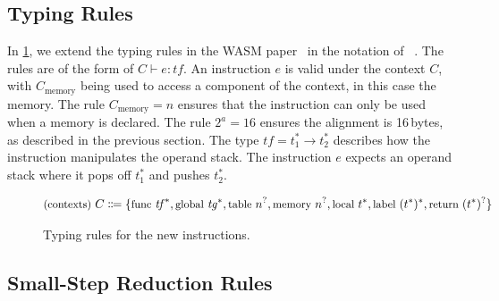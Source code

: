 \subsection{Typing Rules}
\label{subsec:typing}

In \cref{fig:typing-rules}, we extend the typing rules in the \ac{WASM} paper~\cite{haas2017bringing} in the notation of \citeauthor*{pierce2002types}~\cite{pierce2002types}.
The rules are of the form of $C \vdash e : \mathit{tf}$.
An instruction $e$ is valid under the context $C$, with $C_\text{memory}$ being used to access a component of the context, in this case the memory.
The rule $C_\text{memory} = n$ ensures that the instruction can only be used when a memory is declared.
The rule $2^a=16$ ensures the alignment is 16\,bytes, as described in the previous section.
The type $\mathit{tf} = t_1^* \rightarrow t_2^*$ describes how the instruction manipulates the operand stack.
The instruction $e$ expects an operand stack where it pops off $t_1^*$ and pushes $t_2^*$.

\begin{figure}[t]
    \begin{equation*}
        \small
        \text{\small{(contexts)}}\ C \Coloneqq \{ \text{func}\ \mathit{tf}^*, \text{global}\ \mathit{tg}^*, \text{table}\ n^?, \text{memory}\ n^?, \text{local}\ t^*, \text{label}\ (t^*)^*, \text{return}\ (t^*)^? \}
    \end{equation*}
    \begin{prooftree}
    \end{prooftree}
    \begin{prooftree}
    \end{prooftree}
    \begin{prooftree}
    \end{prooftree}
    \caption{Typing rules for the new instructions.}
    \label{fig:typing-rules}
\end{figure}

\subsection{Small-Step Reduction Rules}
\label{subsec:small-step-reduction-rules}

